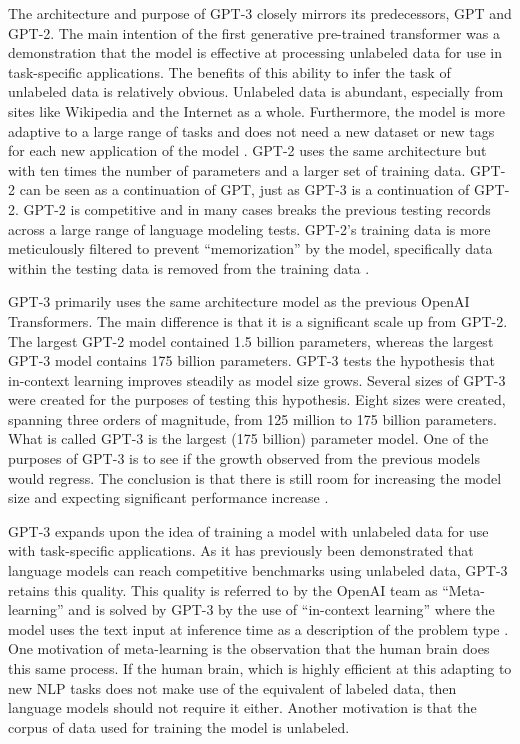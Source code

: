 \documentclass[12pt]{article}
\begin{document}
The architecture and purpose of GPT-3 closely mirrors its predecessors, GPT and
GPT-2. The main intention of the first generative pre-trained transformer was a
demonstration that the model is effective at processing unlabeled data for use
in task-specific applications. The benefits of this ability to infer the task
of unlabeled data is relatively obvious. Unlabeled data is abundant, especially
from sites like Wikipedia and the Internet as a whole.  Furthermore, the model
is more adaptive to a large range of tasks and does not need a new dataset or
new tags for each new application of the model \cite{radford18}. GPT-2 uses the
same architecture but with ten times the number of parameters and a larger set
of training data. GPT-2 can be seen as a continuation of GPT, just as GPT-3 is
a continuation of GPT-2. GPT-2 is competitive and in many cases breaks the
previous testing records across a large range of language modeling tests.
GPT-2's training data is more meticulously filtered to prevent ``memorization''
by the model, specifically data within the testing data is removed from the
training data \cite{radford19}.

GPT-3 primarily uses the same architecture model as the previous OpenAI
Transformers. The main difference is that it is a significant scale up from
GPT-2. The largest GPT-2 model contained 1.5 billion parameters, whereas the
largest GPT-3 model contains 175 billion parameters. GPT-3 tests the hypothesis
that in-context learning improves steadily as model size grows. Several sizes
of GPT-3 were created for the purposes of testing this hypothesis. Eight sizes
were created, spanning three orders of magnitude, from 125 million to 175
billion parameters. What is called GPT-3 is the largest (175 billion) parameter
model. One of the purposes of GPT-3 is to see if the growth observed from the
previous models would regress. The conclusion is that there is still room for
increasing the model size and expecting significant performance increase
\cite{brown20}.

GPT-3 expands upon the idea of training a model with unlabeled data for use
with task-specific applications. As it has previously been demonstrated that
language models can reach competitive benchmarks using unlabeled data, GPT-3
retains this quality. This quality is referred to by the OpenAI team as
``Meta-learning'' and is solved by GPT-3 by the use of ``in-context learning''
where the model uses the text input at inference time as a description of the
problem type \cite{brown20}. One motivation of meta-learning is the observation
that the human brain does this same process. If the human brain, which is
highly efficient at this adapting to new NLP tasks does not make use of the
equivalent of labeled data, then language models should not require it either.
Another motivation is that the corpus of data used for training the model is
unlabeled. \cite{brown20}
\end{document}
